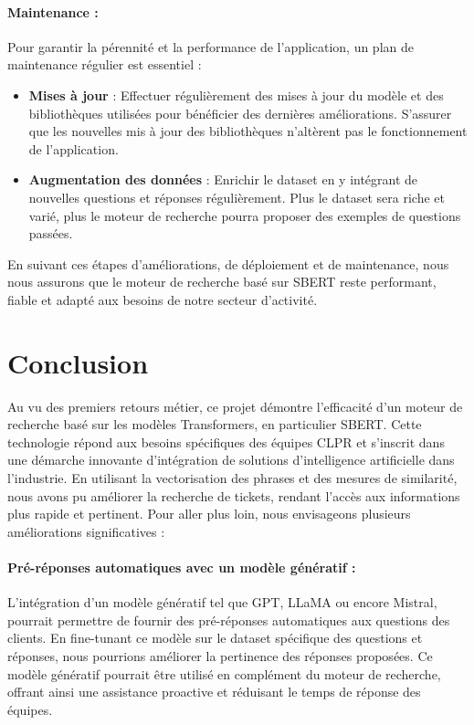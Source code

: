 \documentclass[12pt]{article}
\theoremstyle{definition}
\begin{document}
\paragraph{Maintenance :}

Pour garantir la pérennité et la performance de l'application, un plan de maintenance régulier est essentiel :

\begin{itemize}
	\item \textbf{Mises à jour} : Effectuer régulièrement des mises à jour du modèle et des bibliothèques utilisées pour bénéficier des dernières améliorations. S'assurer que les nouvelles mis à jour des bibliothèques n'altèrent pas le fonctionnement de l'application.    
	\item \textbf{Augmentation des données} : Enrichir le dataset en y intégrant de nouvelles questions et réponses régulièrement. Plus le dataset sera riche et varié, plus le moteur de recherche pourra proposer des exemples de questions passées. 
\end{itemize}

En suivant ces étapes d'améliorations, de déploiement et de maintenance, nous nous assurons que le moteur de recherche basé sur SBERT reste performant, fiable et adapté aux besoins de notre secteur d'activité.
\newpage
\section{Conclusion}

Au vu des premiers retours métier, ce projet démontre l'efficacité d'un moteur de recherche basé sur les modèles Transformers, en particulier SBERT. Cette technologie répond aux besoins spécifiques des équipes CLPR et s'inscrit dans une démarche innovante d'intégration de solutions d'intelligence artificielle dans l'industrie. En utilisant la vectorisation des phrases et des mesures de similarité, nous avons pu améliorer la recherche de tickets, rendant l'accès aux informations plus rapide et pertinent. Pour aller plus loin, nous envisageons plusieurs améliorations significatives :

\paragraph{Pré-réponses automatiques avec un modèle génératif : }
L'intégration d'un modèle génératif tel que GPT, LLaMA ou encore Mistral, pourrait permettre de fournir des pré-réponses automatiques aux questions des clients. En fine-tunant ce modèle sur le dataset spécifique des questions et réponses, nous pourrions améliorer la pertinence des réponses proposées. Ce modèle génératif pourrait être utilisé en complément du moteur de recherche, offrant ainsi une assistance proactive et réduisant le temps de réponse des équipes.
\end{document}
